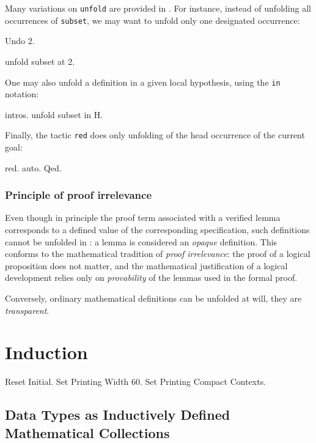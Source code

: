 \documentclass[11pt,a4paper]{book}
\begin{document}
Many variations on \verb:unfold: are provided in \Coq. For instance,
instead of unfolding all occurrences of \verb:subset:, we may want to
unfold only one designated occurrence:
\begin{coq_eval}
Undo 2.
\end{coq_eval}
\begin{coq_example}
unfold subset at 2.
\end{coq_example}

One may also unfold a definition in a given local hypothesis, using the
\verb:in: notation:
\begin{coq_example}
intros.
unfold subset in H.
\end{coq_example}

Finally, the tactic \verb:red: does only unfolding of the head occurrence
of the current goal:
\begin{coq_example}
red.
auto.
Qed.
\end{coq_example}


\subsection{Principle of proof irrelevance}

Even though in principle the proof term associated with a verified lemma
corresponds to a defined value of the corresponding specification, such
definitions cannot be unfolded in \Coq: a lemma is considered an {\sl opaque}
definition. This conforms to the mathematical tradition of {\sl proof
irrelevance}: the proof of a logical proposition does not matter, and the
mathematical justification of a logical development relies only on
{\sl provability} of the lemmas used in the formal proof.

Conversely, ordinary mathematical definitions can be unfolded at will, they
are {\sl transparent}.

\chapter{Induction}

\begin{coq_eval}
Reset Initial.
Set Printing Width 60.
Set Printing Compact Contexts.
\end{coq_eval}

\section{Data Types as Inductively Defined Mathematical Collections}
\end{document}
